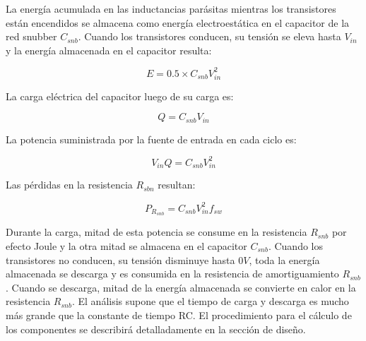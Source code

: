 La energía acumulada en las inductancias parásitas mientras los transistores están encendidos se almacena como energía electroestática en el capacitor de la red snubber $C_{snb}$. 
Cuando los transistores conducen, su tensión se eleva hasta $V_{in}$ y la energía almacenada en el capacitor resulta: 

$$ E=0.5\times C_{snb}V_{in}^{2} $$

La carga eléctrica del capacitor luego de su carga es:

$$ Q=C_{snb}V_{in} $$

La potencia suministrada por la fuente de entrada en cada ciclo es:

$$ V_{in}Q=C_{snb}V_{in}^{2} $$

Las pérdidas en la resistencia $R_{sbn}$ resultan:

$$ P_{R_{snb}}=C_{snb}V_{in}^{2}f_{sw} $$

Durante la carga, mitad de esta potencia se consume en la resistencia $R_{snb}$ por efecto Joule y la otra mitad se almacena en el capacitor $C_{snb}$. 
Cuando los transistores no conducen, su tensión disminuye hasta $0V$, toda la energía almacenada se descarga y es consumida en la resistencia de amortiguamiento $R_{snb}$.
Cuando se descarga, mitad de la energía almacenada se convierte en calor en la resistencia $R_{snb}$. 
El análisis supone que el tiempo de carga y descarga es mucho más grande que la constante de tiempo RC. 
El procedimiento para el cálculo de los componentes se describirá detalladamente en la sección de diseño.